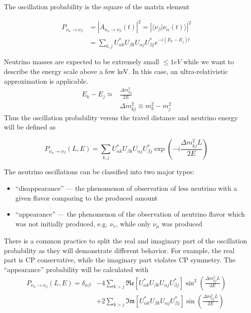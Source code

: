\documentclass[../main.tex]{subfiles}
\begin{document}
The oscillation probability is the square of the matrix element

\begin{align}
P_{\nu_\alpha\to\nu_\beta}&=\left|A_{\nu_\alpha\to\nu_\beta}(t)\right|^2=\left|\langle\nu_\beta\vert\nu_\alpha(t)\rangle\right|^2 \\ \nonumber
{}&=\sum_{k, j}U^*_{\alpha k}U_{\beta k}U_{\alpha j}U^*_{\beta j}e^{-i\left(E_k-E_j\right)t}
\end{align}

Neutrino masses are expected to be extremely small $\leqslant 1eV$ while we want to describe the energy scale above a few keV. In this case, an ultra-relativistic approximation is applicable.
\begin{align}
E_k-E_j \simeq&\frac{\Delta m_{kj}^2}{2E} \\
&\Delta m_{kj}^2 \equiv m^2_k-m^2_j \nonumber
\end{align}
Thus the oscillation probability versus the travel distance and neutrino energy will be defined as

\begin{equation}
P_{\nu_\alpha\to\nu_\beta}(L, E)=\sum_{k, j}U^*_{\alpha k}U_{\beta k}U_{\alpha j}U^*_{\beta j}\exp\left(-i\frac{\Delta m^2_{kj}L}{2E}\right)
\end{equation}

The neutrino oscillations can be classified into two major types:
\begin{itemize}
  \item ``disappearance'' --- the phenomenon of observation of less neutrino with a given flavor comparing to the produced amount
  \item ``appearance'' --- the phenomenon of the observation of neutrino flavor which was not initially produced, e.g. $\nu_e$, while  only $\nu_\mu$ was produced
\end{itemize}
There is a common practice to split the real and imaginary part of the oscillation probability as they will demonstrate different behavior. For example, the real part is CP conservative, while the imaginary part violates CP symmetry. The ``appearance'' probability will be calculated with
\begin{align}
\nonumber
P_{\nu_\alpha\to\nu_\beta}(L, E)=\delta_{\alpha\beta}&-4\sum_{k>j}\mathfrak{Re}\left[U^*_{\alpha k}U_{\beta k}U_{\alpha j}U^*_{\beta j}\right]\sin^2\left(\frac{\Delta m^2_{kj}L}{4E}\right) \\
&+2\sum_{k>j}\mathfrak{Im}\left[U^*_{\alpha k}U_{\beta k}U_{\alpha j}U^*_{\beta j}\right]\sin\left(\frac{\Delta m^2_{kj}L}{2E}\right)
\label{eq:intro:app}
\end{align}
\end{document}
